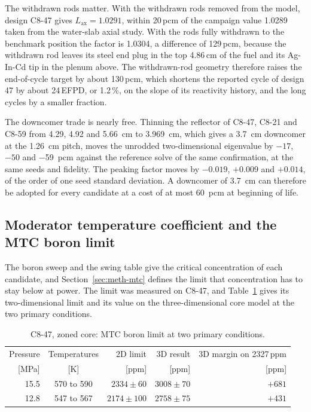 The withdrawn rods matter. With the withdrawn rods removed from the model,
design C8-47 gives $L_\mathrm{ax} = 1.0291$, within 20\,pcm of the
campaign value 1.0289 taken from the water-slab axial study. With the
rods fully withdrawn to the benchmark position the factor is 1.0304, a
difference of 129\,pcm, because the withdrawn rod leaves its steel end
plug in the top 4.86\,cm of the fuel and its Ag-In-Cd tip in the
plenum above. The withdrawn-rod geometry therefore raises the end-of-cycle
target by about 130\,pcm, which shortens the reported cycle of design
47 by about 24\,EFPD, or 1.2\,\%, on the slope of its reactivity
history, and the long cycles by a smaller fraction.

The downcomer trade is nearly free. Thinning the reflector of C8-47,
C8-21 and C8-59 from 4.29, 4.92 and \SI{5.66}{cm} to \SI{3.969}{cm},
which gives a \SI{3.7}{cm} downcomer at the \SI{1.26}{cm} pitch, moves
the unrodded two-dimensional eigenvalue by $-17$, $-50$ and
\SI{-59}{pcm} against the reference solve of the same confirmation, at
the same seeds and fidelity. The peaking factor moves by $-0.019$,
$+0.009$ and $+0.014$, of the order of one seed standard deviation. A
downcomer of \SI{3.7}{cm} can therefore be adopted for every candidate
at a cost of at most \SI{60}{pcm} at beginning of life.

\label{sec:res-c8-refl}\label{fig:c8-post-refl}
\subsection{Moderator temperature coefficient and the MTC boron limit}
\label{sec:res-c8-mtc}

The boron sweep and the swing table give the critical concentration of
each candidate, and Section~\ref{sec:meth-mtc} defines the limit that
concentration has to stay below at power. The limit was measured on
C8-47, and Table~\ref{tab:c8-mtc} gives its two-dimensional limit and
its value on the three-dimensional core model at the two primary
conditions.

\begin{table}[htbp]
  \centering
  \small
  \caption{C8-47, zoned core: MTC boron limit at two primary conditions.}
  \label{tab:c8-mtc}
  \begin{tabular}{@{}rcrrr@{}}
    \toprule
    Pressure & Temperatures & 2D limit & 3D result & 3D margin on 2327\,ppm \\
    {[MPa]} & [K] & [ppm] & [ppm] & [ppm] \\
    \midrule
    15.5 & 570 to 590 & $2334 \pm 60$  & $3008 \pm 70$ & $+681$ \\
    12.8 & 547 to 567 & $2174 \pm 100$ & $2758 \pm 75$ & $+431$ \\
    \bottomrule
  \end{tabular}
\end{table}

